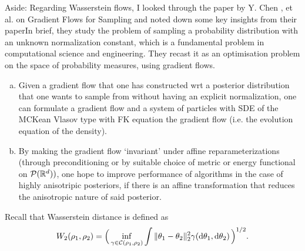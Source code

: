 \documentclass{article}
\begin{document}
\begin{examplesblock}{Aside:}\label{aside: wasserstein flow}
Regarding Wasserstein flows, I looked through the paper by Y. Chen , et al. \cite{chen2023gradientflowssamplingmeanfield} on Gradient Flows for Sampling and noted down some key insights from their paperIn brief, they study the problem of sampling a probability distribution with an unknown normalization constant, which is a fundamental problem in computational science and engineering. They recast it as an optimisation problem on the space of probability measures, using gradient flows. 
\begin{enumerate}[(a)]
    
	\item 	Given a gradient flow that one has constructed wrt a posterior distribution that one wants to sample from without having an explicit normalization, one can formulate a gradient flow and a system of particles with SDE of the MCKean Vlasov type with FK equation the gradient flow (i.e. the evolution equation of the density). 
	\item 	By making the gradient flow ‘invariant’ under affine reparameterizations (through preconditioning or by suitable choice of metric or energy functional on $\mathcal{P}(\mathbb{R}^d))$, one hope to improve performance of algorithms in the case of highly anisotripic posteriors, if there is an affine transformation that reduces the anisotropic nature of said posterior.
\end{enumerate}
\end{examplesblock}



Recall that Wasserstein distance is defined as
\begin{equation}\label{eq:Wasserstein_dual}
W_2(\rho_1,\rho_2)  = \Big(\inf_{\gamma\in \mathcal{C}(\rho_1,\rho_2)}  \int \| \mathbf{\theta}_1- \mathbf{\theta}_2 \|_2^2 \gamma( \operatorname{d}\!  \mathbf{\theta}_1, \operatorname{d}\! \mathbf{\theta}_2) \,\Big)^{1/2}. 
\end{equation}
\end{document}
